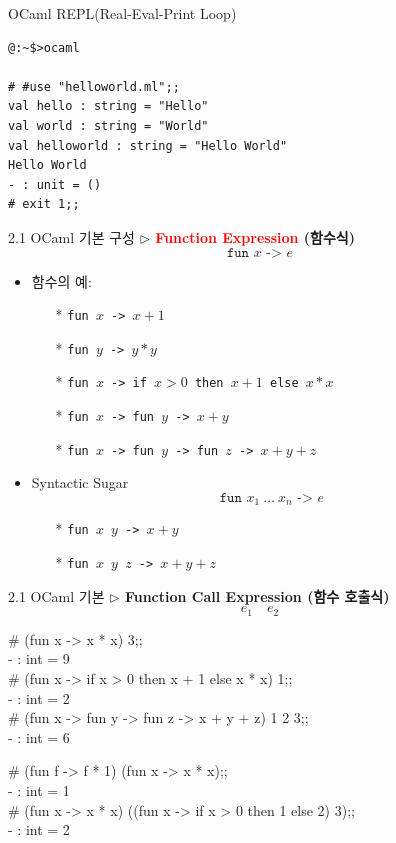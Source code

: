 \documentclass[10pt]{beamer}
\begin{document}
OCaml REPL(Real-Eval-Print Loop)
\begin{lstlisting}[style=zsh]
@:~$>ocaml

# #use "helloworld.ml";;
val hello : string = "Hello"
val world : string = "World"
val helloworld : string = "Hello World"
Hello World
- : unit = ()
# exit 1;;
\end{lstlisting}
	\newpage
	\begin{frame}{2.1 OCaml 기본 구성}
		\textbf{$\triangleright$ \textcolor{red}{Function Expression} (함수식)}
		\[
		\texttt{fun $x$ -> $e$}
		\] 
		\begin{itemize}
			\item 함수의 예:
			\begin{itemize}
				\item[*] \texttt{fun $x$ -> $x+1$}
				\item[*] \texttt{fun $y$ -> $y*y$}
				\item[*] \texttt{fun $x$ -> if $x>0$ then $x+1$ else $x*x$}
				\item[*] \texttt{fun $x$ -> fun $y$ -> $x+y$}
				\item[*] \texttt{fun $x$ -> fun $y$ -> fun $z$ -> $x+y+z$}
			\end{itemize}
			\item[]
			\item Syntactic Sugar \[
			\texttt{fun $x_1\ \dots\ x_n$\ ->\ $e$}
			\]
			\begin{itemize}
				\item[*] \texttt{fun $x$ $y$ -> $x+y$}
				\item[*] \texttt{fun $x$ $y$ $z$ -> $x+y+z$}
			\end{itemize}
		\end{itemize}
	\end{frame}
	\begin{frame}{2.1 OCaml 기본}
		\textbf{$\triangleright$ Function Call Expression (함수 호출식)} \[
		e_1\quad e_2
		\]
		\begin{tcolorbox}[colback=backcolor]\ttfamily
			\# (fun x -> x * x) 3;;\\
			- : int = 9\\
			\# (fun x -> if x > 0 then x + 1 else x * x) 1;;\\
			- : int = 2\\
			\# (fun x -> fun y -> fun z -> x + y + z) 1 2 3;;\\
			- : int = 6
		\end{tcolorbox}
		
		\begin{tcolorbox}[colback=backcolor]\ttfamily
			\# (fun f -> f * 1) (fun x -> x * x);;\\
			- : int = 1\\
			\# (fun x -> x * x) ((fun x -> if x > 0 then 1 else 2) 3);;\\
			- : int = 2
		\end{tcolorbox}
	\end{frame}
\end{document}
